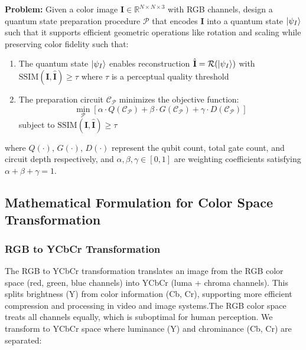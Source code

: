\documentclass[11pt,a4paper]{article}
\begin{document}
\textbf{Problem:} 
Given a color image $\mathbf{I} \in \mathbb{R}^{N \times N \times 3}$ with RGB channels, design a quantum state preparation procedure $\mathcal{P}$ that encodes $\mathbf{I}$ into a quantum state $\ket{\psi_I}$ such that it supports efficient geometric operations like rotation and scaling while preserving color fidelity such that:
\begin{enumerate}
    \item The quantum state $\ket{\psi_I}$ enables reconstruction $\hat{\mathbf{I}} = \mathcal{R}(\ket{\psi_I})$ with $\text{SSIM}(\mathbf{I}, \hat{\mathbf{I}}) \geq \tau$ where $\tau$ is a perceptual quality threshold
    \item The preparation circuit $\mathcal{C}_{\mathcal{P}}$ minimizes the objective function:
    \begin{equation}
    \min_{\mathcal{P}} \left[ \alpha \cdot Q(\mathcal{C}_{\mathcal{P}}) + \beta \cdot G(\mathcal{C}_{\mathcal{P}}) + \gamma \cdot D(\mathcal{C}_{\mathcal{P}}) \right]
    \label{eq:optimization}
    \end{equation}
    subject to $\text{SSIM}(\mathbf{I}, \hat{\mathbf{I}}) \geq \tau$
\end{enumerate}

where $Q(\cdot)$, $G(\cdot)$, $D(\cdot)$ represent the qubit count, total gate count, and circuit depth respectively, and $\alpha, \beta, \gamma \in [0,1]$ are weighting coefficients satisfying $\alpha + \beta + \gamma = 1$.


\subsection{Mathematical Formulation for Color Space Transformation}

\subsubsection{RGB to YCbCr Transformation}
The RGB to YCbCr transformation translates an image from the RGB color space (red, green, blue channels) into YCbCr (luma + chroma channels). This splits brightness (Y) from color information (Cb, Cr), supporting more efficient compression and processing in video and image systems.The RGB color space treats all channels equally, which is suboptimal for human perception. We transform to YCbCr space where luminance (Y) and chrominance (Cb, Cr) are separated:
\end{document}
